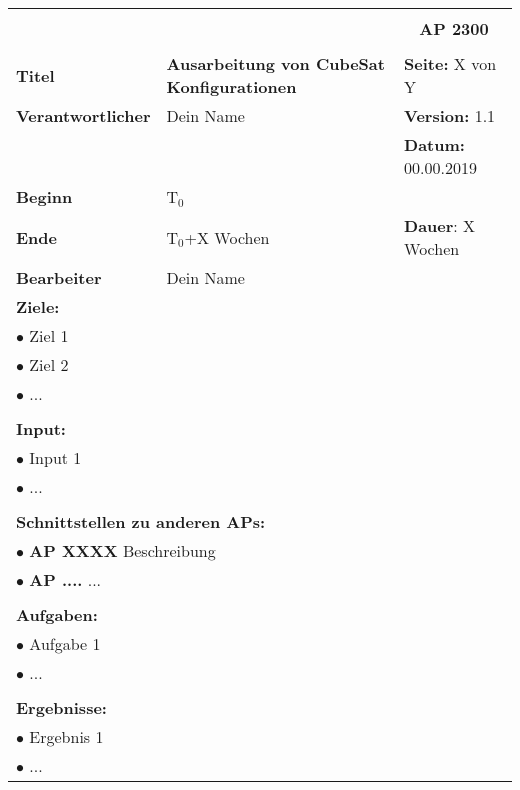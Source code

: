\begin{table}[!h]
 \begin{center}
  \begin{tabular}{|p{35mm}||p{55mm}|p{50mm}||p{40mm}|}
   \hline
   \multicolumn{3}{|l||}{\textbf{}} & \multicolumn{1}{c|}{}\\
   \multicolumn{3}{|l||}{\textbf{}} & \multicolumn{1}{c|}{\textbf{AP 2300}}\\
   \multicolumn{3}{|l||}{\textbf{}} & \multicolumn{1}{c|}{}\\
   \hline\hline
   \textbf{Titel} & \multicolumn{2}{p{7cm}||}{\textbf{Ausarbeitung von CubeSat Konfigurationen}} & \textbf{Seite:} X von Y\\
   \hline
   \textbf{Verantwortlicher} & \multicolumn{2}{l||}{Dein Name} & \textbf{Version:} 1.1\\
   \hline
   \multicolumn{3}{|l||}{} & \textbf{Datum:} 00.00.2019\\
   \hline\hline
   \textbf{Beginn} & \multicolumn{2}{l||}{T$_0$} & \\
   \hline
   \textbf{Ende} & \multicolumn{2}{l||}{T$_0$+X Wochen} & \textbf{Dauer}: X Wochen\\
   \hline\hline
   \textbf{Bearbeiter} & \multicolumn{3}{l|}{Dein Name}\\
   \hline\hline
   \multicolumn{4}{|p{150mm}|}{\textbf{Ziele:}}\\
   \multicolumn{4}{|p{150mm}|}{$\bullet$ Ziel 1}\\
   \multicolumn{4}{|p{150mm}|}{$\bullet$ Ziel 2}\\
   \multicolumn{4}{|p{150mm}|}{$\bullet$ ...}\\
   \multicolumn{4}{|p{150mm}|}{}\\
   \multicolumn{4}{|p{150mm}|}{\textbf{Input:}}\\
   \multicolumn{4}{|p{150mm}|}{$\bullet$ Input 1}\\
   \multicolumn{4}{|p{150mm}|}{$\bullet$ ...}\\
   \multicolumn{4}{|p{150mm}|}{}\\
   \multicolumn{4}{|p{150mm}|}{\textbf{Schnittstellen zu anderen APs:}}\\
   \multicolumn{4}{|p{150mm}|}{$\bullet$ \textbf{AP XXXX} Beschreibung}\\
   \multicolumn{4}{|p{150mm}|}{$\bullet$ \textbf{AP ....} ...}\\
   \multicolumn{4}{|p{150mm}|}{}\\
   \multicolumn{4}{|p{150mm}|}{\textbf{Aufgaben:}}\\
   \multicolumn{4}{|p{150mm}|}{$\bullet$ Aufgabe 1}\\
   \multicolumn{4}{|p{150mm}|}{$\bullet$ ...}\\
   \multicolumn{4}{|p{150mm}|}{}\\
   \multicolumn{4}{|p{150mm}|}{\textbf{Ergebnisse:}}\\
   \multicolumn{4}{|p{150mm}|}{$\bullet$ Ergebnis 1}\\
   \multicolumn{4}{|p{150mm}|}{$\bullet$ ...}\\
   \hline
  \end{tabular}
 \end{center}
\end{table}


